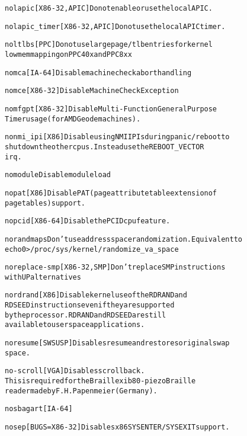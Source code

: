 \documentclass[a4paper,8pt,english]{sphinxmanual}
\begin{document}
\begin{alltt}
        nolapic         {[}X86-32,APIC{]} Do not enable or use the local APIC.

        nolapic\_timer   {[}X86-32,APIC{]} Do not use the local APIC timer.

        noltlbs         {[}PPC{]} Do not use large page/tlb entries for kernel
                        lowmem mapping on PPC40x and PPC8xx

        nomca           {[}IA-64{]} Disable machine check abort handling

        nomce           {[}X86-32{]} Disable Machine Check Exception

        nomfgpt         {[}X86-32{]} Disable Multi-Function General Purpose
                        Timer usage (for AMD Geode machines).

        nonmi\_ipi       {[}X86{]} Disable using NMI IPIs during panic/reboot to
                        shutdown the other cpus.  Instead use the REBOOT\_VECTOR
                        irq.

        nomodule        Disable module load

        nopat           {[}X86{]} Disable PAT (page attribute table extension of
                        pagetables) support.

        nopcid          {[}X86-64{]} Disable the PCID cpu feature.

        norandmaps      Don't use address space randomization.  Equivalent to
                        echo 0 \textgreater{} /proc/sys/kernel/randomize\_va\_space

        noreplace-smp   {[}X86-32,SMP{]} Don't replace SMP instructions
                        with UP alternatives

        nordrand        {[}X86{]} Disable kernel use of the RDRAND and
                        RDSEED instructions even if they are supported
                        by the processor.  RDRAND and RDSEED are still
                        available to user space applications.

        noresume        {[}SWSUSP{]} Disables resume and restores original swap
                        space.

        no-scroll       {[}VGA{]} Disables scrollback.
                        This is required for the Braillex ib80-piezo Braille
                        reader made by F.H. Papenmeier (Germany).

        nosbagart       {[}IA-64{]}

        nosep           {[}BUGS=X86-32{]} Disables x86 SYSENTER/SYSEXIT support.


\end{alltt}
\end{document}
